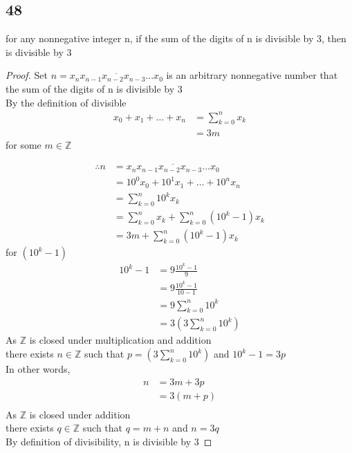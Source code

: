 \documentclass{article}
\begin{document}
\subsection{48}
for any nonnegative integer n, if the sum of the digits of n is divisible by 3, then is divisible by 3
\begin{proof}
Set $n = \overline{x_nx_{n-1}x_{n-2}x_{n-3}...x_0}$ is an arbitrary nonnegative number that the sum of the digits of n is divisible by 3\\
By the definition of divisible\\
\begin{align*}
    x_0 + x_1 + \ldots + x_n &= \sum_{k=0}^nx_k\\
    &= 3m 
\end{align*}
     for some $m \in \mathbb{Z}$


    \begin{align*}
       \therefore
       n &= \overline{x_nx_{n-1}x_{n-2}x_{n-3}...x_0}\\
       &= 10^0 x_0 + 10^1 x_{1} + \ldots + 10^nx_n\\
       &= \sum_{k = 0}^n{10^k x_k}\\
       &= \sum_{k=0}^nx_k + \sum_{k = 0}^n(10^k-1)x_k\\
       &= 3m + \sum_{k = 0}^n(10^k-1)x_k
    \end{align*}
for $(10^k -1)$
\begin{align*}
    10^k - 1 &= 9\frac{10^k - 1}{9}\\
    &= 9\frac{10^k - 1}{10-1}\\
    &= 9 \sum_{k=0}^n{10^k}\\
    &= 3(3\sum_{k=0}^n{10^k})
\end{align*}
As $\mathbb{Z}$ is closed under multiplication and addition\\
there exists $n \in \mathbb{Z}$ such that $p = (3\sum_{k=0}^n{10^k}) $ and $10^k -1 = 3p$\\
In other words,
\begin{align*}
    n &= 3m + 3p\\
    &= 3(m+p)\\
\end{align*}
As $\mathbb{Z}$ is closed under addition\\
there exists $q \in \mathbb{Z}$ such that $q = m+n$ and $n = 3q$\\
By definition of divisibility, n is divisible by 3

\end{proof}
\end{document}
